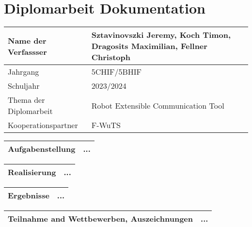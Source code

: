 \chapter{Diplomarbeit Dokumentation}

\begin{center}
\begin{tabular}{| m{8cm} | m{8cm} |}
    \hline
    Name der Verfassser & Sztavinovszki Jeremy, Koch Timon, Dragosits Maximilian, Fellner Christoph\\
    \hline
    Jahrgang & 5CHIF/5BHIF\\
    Schuljahr & 2023/2024\\
    \hline
    Thema der Diplomarbeit & Robot Extensible Communication Tool\\
    \hline
    Kooperationspartner & F-WuTS\\
    \hline
\end{tabular}

\vspace{5mm}

\begin{tabular}{| m{8cm} | m{8cm} |}
    \hline
    Aufgabenstellung & ...\\ %
    \hline
\end{tabular}

\vspace{5mm}

\begin{tabular}{| m{8cm} | m{8cm} |}
    \hline
    Realisierung & ...\\ %
    \hline
\end{tabular}

\vspace{5mm}

\begin{tabular}{| m{8cm} | m{8cm} |}
    \hline
    Ergebnisse & ...\\ %
    \hline
\end{tabular}

\vspace{5mm}

\begin{tabular}{| m{8cm} | m{8cm} |}
    \hline
    Teilnahme and Wettbewerben, Auszeichnungen & ...\\ %
    \hline
\end{tabular}

\vspace{5mm}


\end{center}
